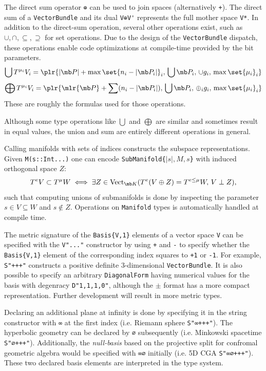 \documentclass{juliacon}
\begin{document}
The direct sum operator \verb`⊕` can be used to join spaces (alternatively \verb`+`).
The direct sum of a \verb`VectorBundle` and its dual \verb`V⊕V'` represents the full mother space \verb`V*`.
In addition to the direct-sum operation, several other operations exist, such as $\cup,\cap,\subseteq,\supseteq$ for set operations.
Due to the design of the \verb`VectorBundle` dispatch, these operations enable code optimizations at compile-time provided by the bit parameters.
$$ \bigcup T^{\mu_i}V_i = \plr{|\mb P|+\max\set{n_i-|\mb P_i|}_i,\, \bigcup \mb P_i,\, \cup g_i,\, \max\set{\mu_i}_i} $$
$$ \bigoplus T^{\mu_i}V_i = \plr{\mlr{\mb P}+\sum (n_i-|\mb P_i|),\, \bigcup \mb P_i,\, \oplus_i g_i,\,\max\set{\mu_i}_i} $$
These are roughly the formulas used for those operations.
\begin{remark}
	Although some type operations like $\bigcup$ and $\bigoplus$ are similar and sometimes result in equal values, the union and sum are entirely different operations in general.
\end{remark}

Calling manifolds with sets of indices constructs the subspace representations.
Given \verb`M(s::Int...)` one can encode \verb+SubManifold{+$|s|,M,s$\verb+}+ with induced orthogonal space $Z$:
$$T^eV \subset T^\mu W \iff \exists Z\in\text{Vect}_{\mb K}(T^e(V\oplus Z) = T^{e\leq \mu}W,\,V\perp Z),$$
such that computing unions of submanifolds is done by inspecting the parameter $s\in V\subseteq W$ and $s\notin Z$. Operations on \verb`Manifold` types is automatically handled at compile time.

The metric signature of the \verb+Basis{V,1}+ elements of a vector space \verb+V+ can be specified with the \verb+V"..."+ constructor by using \verb-+- and \verb+-+ to specify whether the \verb+Basis{V,1}+ element of the corresponding index squares to \verb`+1` or \verb`-1`.
For example, \verb`S"+++"` constructs a positive definite 3-dimensional \verb`VectorBundle`.
It is also possible to specify an arbitrary \verb`DiagonalForm` having numerical values for the basis with degenracy \verb`D"1,1,1,0"`, although the $\pm$ format has a more compact representation.
Further development will result in more metric types.

Declaring an additional plane at infinity is done by specifying it in the string constructor with \verb`∞` at the first index (i.e. Riemann sphere \verb`S"∞+++"`). The hyperbolic geometry can be declared by \verb`∅` subsequently (i.e. Minkowski spacetime \verb`S"∅+++"`). 
Additionally, the \textit{null-basis} based on the projective split for confromal geometric algebra would be specified with \verb`∞∅` initially (i.e. 5D CGA \verb`S"∞∅+++"`). These two declared basis elements are interpreted in the type system. %
\end{document}
